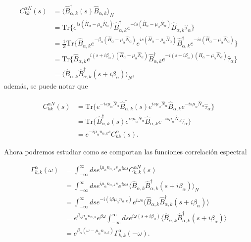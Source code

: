 \begin{appendixs}
\begin{align*}
    C^{\alpha N}_{kk}(s) & =  \langle \hat{B}^{\dagger}_{\alpha,k}(s)\hat{B}_{\alpha,k} \rangle_{N} \\
   &  = \text{Tr}\{e^{is(\hat{H}_{\alpha} - \mu_{\alpha}\hat{N}_{\alpha})}\hat{B}^{\dagger}_{\alpha,k}e^{-is(\hat{H}_{\alpha} - \mu_{\alpha}\hat{N}_{\alpha})}\hat{B}_{\alpha,k}\hat{\tau}_{\alpha}  \} \\
   & = \frac{1}{Z}\text{Tr}\{\hat{B}_{\alpha,k} e^{-\beta_{\alpha}(\hat{H}_{\alpha} - \mu_{\alpha}\hat{N}_{\alpha})} e^{is(\hat{H}_{\alpha} - \mu_{\alpha}\hat{N}_{\alpha})}\hat{B}^{\dagger}_{\alpha,k}e^{-is(\hat{H}_{\alpha} - \mu_{\alpha}\hat{N}_{\alpha})}\} \\
   & = \text{Tr}\{\hat{B}_{\alpha,k}e^{i(s+i\beta_{\alpha})(\hat{H}_{\alpha} - \mu_{\alpha}\hat{N}_{\alpha})}\hat{B}^{\dagger}_{\alpha,k}e^{-i(s+i\beta_{\alpha})(\hat{H}_{\alpha} - \mu_{\alpha}\hat{N}_{\alpha})}\hat{\tau}_{\alpha} \} \\
   & = \langle \hat{B}_{\alpha,k} \hat{B}^{\dagger}_{\alpha,k}(s+i\beta_{\alpha})\rangle_{N},
\end{align*}
además, se puede notar que

\begin{align*}
    C^{\alpha N}_{kk}(s) & = \text{Tr}\{e^{-is\mu_{\alpha}\hat{N}_{\alpha} }\hat{B}^{\dagger}_{\alpha,k}(s)e^{is\mu_{\alpha}\hat{N}_{\alpha}} \hat{B}_{\alpha,k}e^{-is\mu_{\alpha}\hat{N}_{\alpha} }\hat{\tau}_{\alpha}   \} \\
 & = \text{Tr}\{\hat{B}^{\dagger}_{\alpha,k}(s)e^{is\mu_{\alpha}\hat{N}_{\alpha}} \hat{B}_{\alpha,k}e^{-is\mu_{\alpha}\hat{N}_{\alpha}}\hat{\tau}_{\alpha}   \}\\
 & = e^{-i\mu_{\alpha}n_{\alpha,k}s} C^{\alpha}_{kk}(s).
\end{align*}

Ahora podremos estudiar como se comportan las funciones correlación espectral

\begin{align*}
    \Gamma^{\alpha}_{k,k}(\omega) & = \int_{-\infty}^{\infty}ds e^{i\mu_{\alpha}n_{\alpha,k}s} e^{i\omega s}C^{\alpha N}_{k,k}(s) \\
    & = \int_{-\infty}^{\infty}ds e^{i\mu_{\alpha}n_{\alpha,k}s} e^{i\omega s}\langle \hat{B}_{\alpha,k} \hat{B}^{\dagger}_{\alpha,k}(s+i\beta_{\alpha}) \rangle_{N} \\
    & = \int_{-\infty}^{\infty}ds e^{-i(i\beta \mu_{\alpha}n_{\alpha,k})} e^{i\omega s} \langle \hat{B}_{\alpha,k}\hat{B}^{\dagger}_{\alpha,k}(s+i\beta_{\alpha}) \rangle \\
    & = e^{\beta_{\alpha}\mu_{\alpha}n_{\alpha,k}}e^{\beta \omega} \int_{-\infty}^{\infty} ds e^{i\omega(s+i\beta_{\alpha})} \langle \hat{B}_{\alpha,k}\hat{B}^{\dagger}_{\alpha,k}(s+i\beta_{\alpha}) \rangle \\
    & = e^{\beta_{\alpha}(\omega - \mu_{\alpha}n_{\alpha,k})} \Gamma^{\alpha}_{k,k}(-\omega).
\end{align*}



\end{appendixs}
